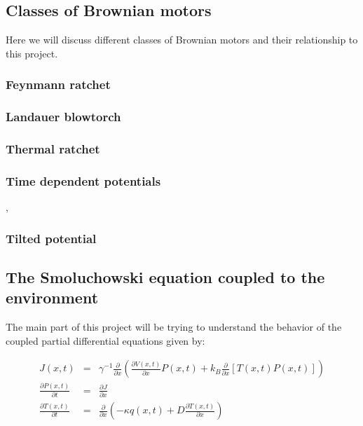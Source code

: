 \documentclass[11pt]{article} %
\begin{document}
\subsection{Classes of Brownian motors} \label{BrownianMotorClasses}
Here we will discuss different classes of Brownian motors and their relationship to this project.

\subsubsection{Feynmann ratchet}

\subsubsection{Landauer blowtorch}
\cite{Landauer1988}

\subsubsection{Thermal ratchet}
\cite{Pedro2014}

\subsubsection{Time dependent potentials}
\cite{JoelBader1999}, \cite{BlickleBechinger2011}

\subsubsection{Tilted potential}

\subsection{The Smoluchowski equation coupled to the environment} \label{Smoluchowski}

The main part of this project will be trying to understand the behavior of the coupled partial differential equations given by:

\begin{eqnarray}
J(x, t) &=& \gamma^{-1} \frac{\partial}{\partial x} \left ( \frac{\partial V(x, t)}{\partial x} P(x, t) + k_B \frac{\partial}{\partial x} \left [T(x, t) P(x, t) \right] \right )  \\
\frac{\partial P(x, t)}{\partial t} &=& \frac{\partial J}{\partial x} \label{eqn:Smoluchowski} \\
\frac{\partial T(x, t)}{\partial t} &=& \frac{\partial}{\partial x} \left ( -\kappa q(x, t) + D \frac{\partial T(x, t)}{\partial x} \right ) \label{eqn:TemperatureEvolution}
\end{eqnarray}
\end{document}

